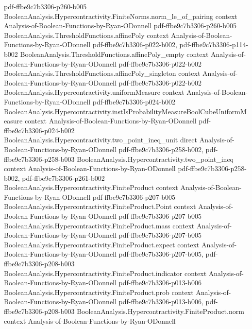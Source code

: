 \begin{theorem}
  {pdf-ffbe9c7b3306-p260-b005}
\proofstep
  {BooleanAnalysis.Hypercontractivity.FiniteNorms.norm_le_of_pairing}
  {context}
  {Analysis-of-Boolean-Functions-by-Ryan-ODonnell}
  {pdf-ffbe9c7b3306-p260-b005}
\proofstep
  {BooleanAnalysis.ThresholdFunctions.affinePoly}
  {context}
  {Analysis-of-Boolean-Functions-by-Ryan-ODonnell}
  {pdf-ffbe9c7b3306-p022-b002,
    pdf-ffbe9c7b3306-p114-b002}
\proofstep
  {BooleanAnalysis.ThresholdFunctions.affinePoly_empty}
  {context}
  {Analysis-of-Boolean-Functions-by-Ryan-ODonnell}
  {pdf-ffbe9c7b3306-p022-b002}
\proofstep
  {BooleanAnalysis.ThresholdFunctions.affinePoly_singleton}
  {context}
  {Analysis-of-Boolean-Functions-by-Ryan-ODonnell}
  {pdf-ffbe9c7b3306-p022-b002}
\proofstep
  {BooleanAnalysis.Hypercontractivity.uniformMeasure}
  {context}
  {Analysis-of-Boolean-Functions-by-Ryan-ODonnell}
  {pdf-ffbe9c7b3306-p024-b002}
\proofstep
  {BooleanAnalysis.Hypercontractivity.instIsProbabilityMeasureBoolCubeUniformMeasure}
  {context}
  {Analysis-of-Boolean-Functions-by-Ryan-ODonnell}
  {pdf-ffbe9c7b3306-p024-b002}
\proofstep
  {BooleanAnalysis.Hypercontractivity.two_point_ineq_unit}
  {direct}
  {Analysis-of-Boolean-Functions-by-Ryan-ODonnell}
  {pdf-ffbe9c7b3306-p258-b002,
    pdf-ffbe9c7b3306-p258-b003}
\proofstep
  {BooleanAnalysis.Hypercontractivity.two_point_ineq}
  {context}
  {Analysis-of-Boolean-Functions-by-Ryan-ODonnell}
  {pdf-ffbe9c7b3306-p258-b002,
    pdf-ffbe9c7b3306-p261-b002}
\proofstep
  {BooleanAnalysis.Hypercontractivity.FiniteProduct}
  {context}
  {Analysis-of-Boolean-Functions-by-Ryan-ODonnell}
  {pdf-ffbe9c7b3306-p207-b005}
\proofstep
  {BooleanAnalysis.Hypercontractivity.FiniteProduct.Point}
  {context}
  {Analysis-of-Boolean-Functions-by-Ryan-ODonnell}
  {pdf-ffbe9c7b3306-p207-b005}
\proofstep
  {BooleanAnalysis.Hypercontractivity.FiniteProduct.mass}
  {context}
  {Analysis-of-Boolean-Functions-by-Ryan-ODonnell}
  {pdf-ffbe9c7b3306-p207-b005}
\proofstep
  {BooleanAnalysis.Hypercontractivity.FiniteProduct.expect}
  {context}
  {Analysis-of-Boolean-Functions-by-Ryan-ODonnell}
  {pdf-ffbe9c7b3306-p207-b005,
    pdf-ffbe9c7b3306-p208-b003}
\proofstep
  {BooleanAnalysis.Hypercontractivity.FiniteProduct.indicator}
  {context}
  {Analysis-of-Boolean-Functions-by-Ryan-ODonnell}
  {pdf-ffbe9c7b3306-p013-b006}
\proofstep
  {BooleanAnalysis.Hypercontractivity.FiniteProduct.prob}
  {context}
  {Analysis-of-Boolean-Functions-by-Ryan-ODonnell}
  {pdf-ffbe9c7b3306-p013-b006,
    pdf-ffbe9c7b3306-p208-b003}
\proofstep
  {BooleanAnalysis.Hypercontractivity.FiniteProduct.norm}
  {context}
  {Analysis-of-Boolean-Functions-by-Ryan-ODonnell}

\end{theorem}
